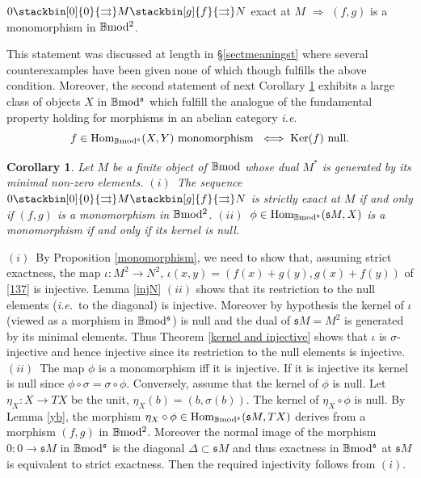 \documentclass[12pt]{article}
\newtheorem{cor}[thm]{Corollary}
\def\Hom{{\rm Hom}}
\def\B{{\mathbb B}}
\def\strg{strict }
\def\strgly{strictly }
\newcommand{\ie}{{\it i.e.\/}\ }
\def\ker{{\mbox{Ker}}}
\def\Hom {{\mbox{Hom}}}
\def\yb{\mathfrak{s}}
\def\bmod{{\rm \B mod}}
\def\bm2{{\rm \B mod^2}}
\def\b2{{\rm \B mod^{\mathfrak s}}}
\begin{document}
\centerline{$0 \stackbin[0]{0}{\rightrightarrows}M\stackbin[g]{f}{\rightrightarrows}N$  exact at $M$ $\Rightarrow$ $(f,g)$ is a monomorphism in $\bm2$.}
This statement was discussed at length in \S\ref{sectmeaningst}  where several counterexamples have been given none of which though fulfills the above condition. Moreover, the second statement of next Corollary \ref{exactrad} exhibits a large class of objects $X$ in $\b2$ which fulfill the analogue of the fundamental property holding for morphisms in an abelian category \ie
\begin{equation}\label{nullmono}
	f\in \Hom_\b2(X,Y) \ \text{monomorphism}\ \iff \ker(f)\ \text{null}.
\end{equation}
\begin{cor}\label{exactrad} Let $M$ be a finite object of $\bmod$ whose dual $M^*$ is generated by its minimal non-zero elements. \newline
$(i)$~The sequence  $0 \stackbin[0]{0}{\rightrightarrows}M\stackbin[g]{f}{\rightrightarrows}N$ is \strgly exact at $M$   if and only if $(f,g)$ is a monomorphism in $\bm2$.	\newline
$(ii)$~$\phi\in \Hom_\b2(\yb M,X)$ is a monomorphism if and only if its kernel is null.
\end{cor}
\proof   $(i)$~By Proposition \ref{monomorphism}, we need to show   that, assuming \strg exactness, the map $\iota:M^2\to N^2$, $\iota(x,y)=(f(x)+g(y), g(x)+f(y))$ of \eqref{137} is injective. Lemma \ref{injN} $(ii)$ shows that its restriction to the null elements (\ie to the diagonal) is injective. Moreover by hypothesis the kernel of $\iota$ (viewed as a morphism in $\b2$) is null and the dual of $\yb M=M^2$ is generated by its minimal elements. Thus Theorem \ref{kernel and injective} shows that $\iota$ is $\sigma$-injective and hence injective since its restriction to the null elements  is injective.  \newline
$(ii)$~The map $\phi$ is a monomorphism iff it is injective. If it is injective its kernel is null since $\phi\circ \sigma=\sigma\circ \phi$. Conversely, assume that the kernel of $\phi$ is null. Let $\eta_X:X\to TX$ be the unit, $\eta_X(b)=(b,\sigma(b))$. The kernel of $\eta_X\circ \phi$ is null.  By Lemma \ref{yb}, the morphism $\eta_X\circ \phi\in \Hom_\b2(\yb M,TX)$ derives from a morphism $(f,g)$ in $\bm2$. Moreover the normal image of the morphism $0:0\to \yb M$ in $\b2$ is the diagonal $\Delta\subset \yb M$ and thus exactness in $\b2$ at $\yb M$ is equivalent to \strg exactness. Then  the required injectivity follows from $(i)$. \endproof 
\end{document}
